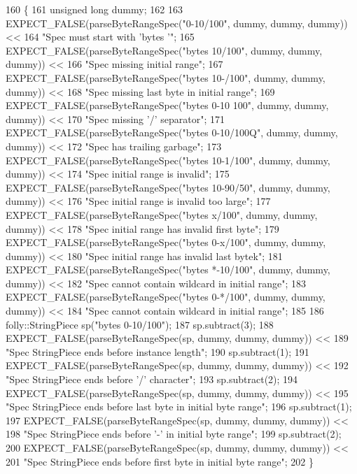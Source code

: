 \begin{DoxyCode}
160                                   \{
161   \textcolor{keywordtype}{unsigned} \textcolor{keywordtype}{long} dummy;
162 
163   EXPECT\_FALSE(parseByteRangeSpec(\textcolor{stringliteral}{"0-10/100"}, dummy, dummy, dummy)) <<
164     \textcolor{stringliteral}{"Spec must start with 'bytes '"};
165   EXPECT\_FALSE(parseByteRangeSpec(\textcolor{stringliteral}{"bytes 10/100"}, dummy, dummy, dummy)) <<
166     \textcolor{stringliteral}{"Spec missing initial range"};
167   EXPECT\_FALSE(parseByteRangeSpec(\textcolor{stringliteral}{"bytes 10-/100"}, dummy, dummy, dummy)) <<
168     \textcolor{stringliteral}{"Spec missing last byte in initial range"};
169   EXPECT\_FALSE(parseByteRangeSpec(\textcolor{stringliteral}{"bytes 0-10 100"}, dummy, dummy, dummy)) <<
170     \textcolor{stringliteral}{"Spec missing '/' separator"};
171   EXPECT\_FALSE(parseByteRangeSpec(\textcolor{stringliteral}{"bytes 0-10/100Q"}, dummy, dummy, dummy)) <<
172     \textcolor{stringliteral}{"Spec has trailing garbage"};
173   EXPECT\_FALSE(parseByteRangeSpec(\textcolor{stringliteral}{"bytes 10-1/100"}, dummy, dummy, dummy)) <<
174     \textcolor{stringliteral}{"Spec initial range is invalid"};
175   EXPECT\_FALSE(parseByteRangeSpec(\textcolor{stringliteral}{"bytes 10-90/50"}, dummy, dummy, dummy)) <<
176     \textcolor{stringliteral}{"Spec initial range is invalid too large"};
177   EXPECT\_FALSE(parseByteRangeSpec(\textcolor{stringliteral}{"bytes x/100"}, dummy, dummy, dummy)) <<
178     \textcolor{stringliteral}{"Spec initial range has invalid first byte"};
179   EXPECT\_FALSE(parseByteRangeSpec(\textcolor{stringliteral}{"bytes 0-x/100"}, dummy, dummy, dummy)) <<
180     \textcolor{stringliteral}{"Spec initial range has invalid last bytek"};
181   EXPECT\_FALSE(parseByteRangeSpec(\textcolor{stringliteral}{"bytes *-10/100"}, dummy, dummy, dummy)) <<
182     \textcolor{stringliteral}{"Spec cannot contain wildcard in initial range"};
183   EXPECT\_FALSE(parseByteRangeSpec(\textcolor{stringliteral}{"bytes 0-*/100"}, dummy, dummy, dummy)) <<
184     \textcolor{stringliteral}{"Spec cannot contain wildcard in initial range"};
185 
186   folly::StringPiece sp(\textcolor{stringliteral}{"bytes 0-10/100"});
187   sp.subtract(3);
188   EXPECT\_FALSE(parseByteRangeSpec(sp, dummy, dummy, dummy)) <<
189     \textcolor{stringliteral}{"Spec StringPiece ends before instance length"};
190   sp.subtract(1);
191   EXPECT\_FALSE(parseByteRangeSpec(sp, dummy, dummy, dummy)) <<
192     \textcolor{stringliteral}{"Spec StringPiece ends before '/' character"};
193   sp.subtract(2);
194   EXPECT\_FALSE(parseByteRangeSpec(sp, dummy, dummy, dummy)) <<
195     \textcolor{stringliteral}{"Spec StringPiece ends before last byte in initial byte range"};
196   sp.subtract(1);
197   EXPECT\_FALSE(parseByteRangeSpec(sp, dummy, dummy, dummy)) <<
198     \textcolor{stringliteral}{"Spec StringPiece ends before '-' in initial byte range"};
199   sp.subtract(2);
200   EXPECT\_FALSE(parseByteRangeSpec(sp, dummy, dummy, dummy)) <<
201     \textcolor{stringliteral}{"Spec StringPiece ends before first byte in initial byte range"};
202 \}
\end{DoxyCode}
